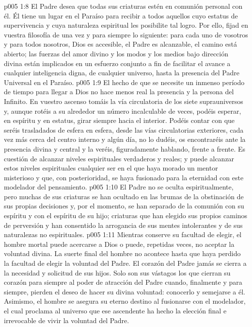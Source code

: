\vs p005 1:8 El Padre desea que todas sus criaturas estén en comunión personal con él. Él tiene un lugar en el Paraíso para recibir a todos aquellos cuyo estatus de supervivencia y cuya naturaleza espiritual les posibilite tal logro. Por ello, fijad en vuestra filosofía de una vez y para siempre lo siguiente: para cada uno de vosotros y para todos nosotros, Dios es accesible, el Padre es alcanzable, el camino está abierto; las fuerzas del amor divino y los modos y los medios bajo dirección divina están implicados en un esfuerzo conjunto a fin de facilitar el avance a cualquier inteligencia digna, de cualquier universo, hasta la presencia del Padre Universal en el Paraíso.
\vs p005 1:9 El hecho de que se necesite un inmenso período de tiempo para llegar a Dios no hace menos real la presencia y la persona del Infinito. En vuestro ascenso tomáis la vía circulatoria de los siete suprauniversos y, aunque rotéis a su alrededor un número incalculable de veces, podéis esperar, en espíritu y en estatus, girar siempre hacia el interior. Podéis contar con que seréis trasladados de esfera en esfera, desde las vías circulatorias exteriores, cada vez más cerca del centro interno y algún día, no lo dudéis, os encontraréis ante la presencia divina y central y la veréis, figuradamente hablando, frente a frente. Es cuestión de alcanzar niveles espirituales verdaderos y reales; y puede alcanzar estos niveles espirituales cualquier ser en el que haya morado un mentor misterioso y que, con posterioridad, se haya fusionado para la eternidad con este modelador del pensamiento.
\vs p005 1:10 \pc El Padre no se oculta espiritualmente, pero muchas de sus criaturas se han ocultado en las brumas de la obstinación de sus propias decisiones y, por el momento, se han separado de la comunión con su espíritu y con el espíritu de su hijo; criaturas que han elegido sus propios caminos de perversión y han consentido la arrogancia de sus mentes intolerantes y de sus naturalezas no espirituales.
\vs p005 1:11 Mientras conserve su facultad de elegir, el hombre mortal puede acercarse a Dios o puede, repetidas veces, no aceptar la voluntad divina. La suerte final del hombre no acontece hasta que haya perdido la facultad de elegir la voluntad del Padre. El corazón del Padre jamás se cierra a la necesidad y solicitud de sus hijos. Solo son sus vástagos los que cierran su corazón para siempre al poder de atracción del Padre cuando, finalmente y para siempre, pierden el deseo de hacer su divina voluntad: conocerlo y semejarse a él. Asimismo, el hombre se asegura su eterno destino al fusionarse con el modelador, el cual proclama al universo que ese ascendente ha hecho la elección final e irrevocable de vivir la voluntad del Padre.
